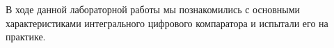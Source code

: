 \documentclass[bachelor, och, otchet, hidelinks]{SCWorks}
\begin{document}
\newpage

\conclusion

\par В ходе данной лабораторной работы мы познакомились с основными характеристиками интегрального цифрового
компаратора и испытали его на практике.

\newpage

%

%
%
%


\end{document}
